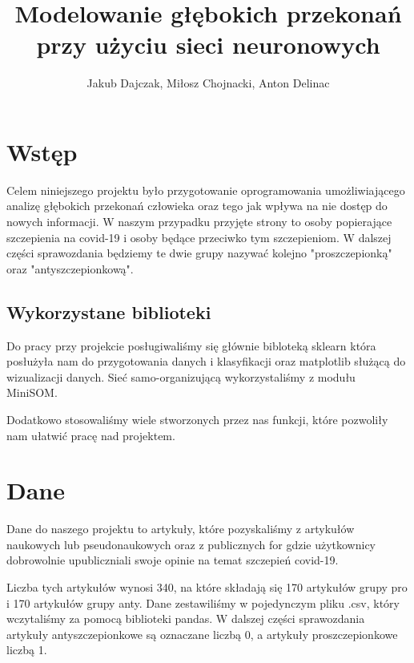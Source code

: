 \documentclass[11pt]{article}
\title{Modelowanie głębokich przekonań\\
    przy użyciu sieci neuronowych}
\author{Jakub Dajczak, Miłosz Chojnacki, Anton Delinac}
\begin{document}
    
    \maketitle
    

\section*{Wstęp}

Celem niniejszego projektu było przygotowanie oprogramowania umożliwiającego 
analizę głębokich przekonań człowieka oraz tego jak wpływa na nie dostęp do 
nowych informacji. W naszym przypadku przyjęte strony to osoby popierające 
szczepienia na covid-19 i osoby będące przeciwko tym szczepieniom. W dalszej 
części sprawozdania będziemy te dwie grupy nazywać kolejno "proszczepionką" 
oraz "antyszczepionkową".

\subsection*{Wykorzystane biblioteki}

Do pracy przy projekcie posługiwaliśmy się głównie bibloteką sklearn która posłużyła nam do
przygotowania danych i klasyfikacji oraz matplotlib służącą do wizualizacji danych.
Sieć samo-organizującą wykorzystaliśmy z modułu MiniSOM.

Dodatkowo stosowaliśmy wiele stworzonych przez nas funkcji, które pozwoliły nam 
ułatwić pracę nad projektem.

\section*{Dane}

Dane do naszego projektu to artykuły, które pozyskaliśmy z artykułów naukowych 
lub pseudonaukowych oraz
z publicznych for gdzie użytkownicy dobrowolnie upubliczniali swoje opinie 
na temat szczepień covid-19.

Liczba tych artykułów wynosi 340, na które składają się 170 
artykułów grupy pro i 170 artykułów grupy anty. Dane zestawiliśmy w pojedynczym 
pliku .csv, który wczytaliśmy za pomocą biblioteki pandas. W dalszej części 
sprawozdania artykuły antyszczepionkowe są oznaczane liczbą 0, a artykuły 
proszczepionkowe liczbą 1.

        
\begin{center}
\end{center}
    
\end{document}

